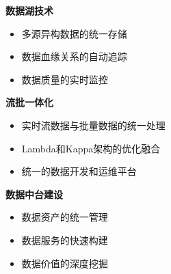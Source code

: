 \textbf{数据湖技术} \begin{itemize} \tightlist \item 多源异构数据的统一存储 \item 数据血缘关系的自动追踪 \item 数据质量的实时监控 \end{itemize}
\textbf{流批一体化} \begin{itemize} \tightlist \item 实时流数据与批量数据的统一处理 \item Lambda和Kappa架构的优化融合 \item 统一的数据开发和运维平台
\end{itemize} \textbf{数据中台建设} \begin{itemize} \tightlist \item 数据资产的统一管理 \item 数据服务的快速构建 \item 数据价值的深度挖掘 \end{itemize}
